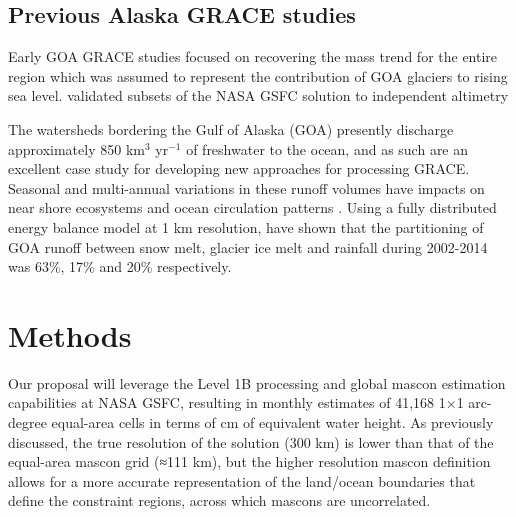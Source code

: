 \documentclass[review,oneside]{igs}
\begin{document}
\subsection{Previous Alaska GRACE studies}      

Early GOA GRACE studies focused on recovering the mass trend for the entire region which was assumed to represent the contribution of GOA glaciers to rising sea level. \citep{arendt} validated subsets of the NASA GSFC solution to independent altimetry  \cite{arendt_analysis_2013}
 
The watersheds bordering the Gulf of Alaska (GOA) presently discharge approximately 850 km$^3$ yr$^{-1}$ \citep{hill_spatial_2015} of freshwater to the ocean, and as such are an excellent case study for developing new approaches for processing GRACE. Seasonal and multi-annual variations in these runoff volumes have impacts on near shore ecosystems and ocean circulation patterns \citep{oneel_icefield--ocean_2015}. Using a fully distributed energy balance model at 1 km resolution, \cite{beamer_high-resolution_2016} have shown that the partitioning of GOA runoff between snow melt, glacier ice melt and rainfall during 2002-2014 was 63\%, 17\% and 20\% respectively. 




\citep{lenaerts_irreversible_2013}

\section{Methods}


Our proposal will leverage the Level 1B processing and global mascon estimation capabilities at NASA GSFC, resulting in monthly estimates of 41,168 1×1 arc-degree equal-area cells in terms of cm of equivalent water height. As previously discussed, the true resolution of the solution (300 km) is lower than that of the equal-area mascon grid (≈111 km), but the higher resolution mascon definition allows for a more accurate representation of the land/ocean boundaries that define the constraint regions, across which mascons are uncorrelated.
\end{document}
